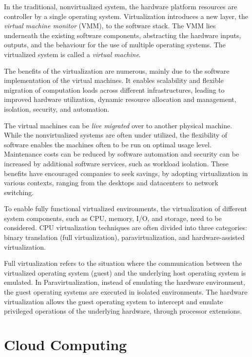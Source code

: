In the traditional, nonvirtualized system, the hardware platform resources are controller by a single operating system. Virtualization introduces a new layer, the \emph{virtual machine monitor} (VMM), to the software stack. The VMM lies underneath the existing software components, abstracting the hardware inputs, outputs, and the behaviour for the use of multiple operating systems. The virtualized system is called a \emph{virtual machine}.~\cite{Uhlig:2005:IVT, Bugnion:2012:BVX}

The benefits of the virtualization are numerous, mainly due to the software implementation of the virtual machines. It enables scalability and flexible migration of computation loads across different infrastructures, leading to improved hardware utilization, dynamic resource allocation and management, isolation, security, and automation.~\cite{Pearce:2013:VIS}

The virtual machines can be \emph{live migrated} over to another physical machine. While the nonvirtualized systems are often under utilized, the flexibility of software enables the machines often to be run on optimal usage level. Maintenance costs can be reduced by software automation and security can be increased by additional software services, such as workload isolation. These benefits have encouraged companies to seek savings, by adopting virtualization in various contexts, ranging from the desktops and datacenters to network switching.~\cite{Pearce:2013:VIS}

To enable fully functional virtualized environments, the virtualization of different system components, such as CPU, memory, I/O, and storage, need to be considered. CPU virtualization techniques are often divided into three categories: binary translation (full virtualization), paravirtualization, and hardware-assisted virtualization.~\cite{Bugnion:2012:BVX, Pearce:2013:VIS}

Full virtualization refers to the situation where the communication between the virtualized operating system (guest) and the underlying host operating system is emulated. In Paravirtualization, instead of emulating the hardware environment, the guest operating systems are executed in isolated environments. The hardware virtualization allows the guest operating system to intercept and emulate privileged operations of the underlying hardware, through processor extensions.~\cite{Pearce:2013:VIS}

\section{Cloud Computing}

